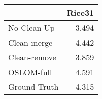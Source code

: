 \begin{tabular}{lr}
\toprule
{} & Rice31 \\
\midrule
No Clean Up  &  3.494 \\
Clean-merge  &  4.442 \\
Clean-remove &  3.859 \\
OSLOM-full   &  4.591 \\
Ground Truth &  4.315 \\
\bottomrule
\end{tabular}
